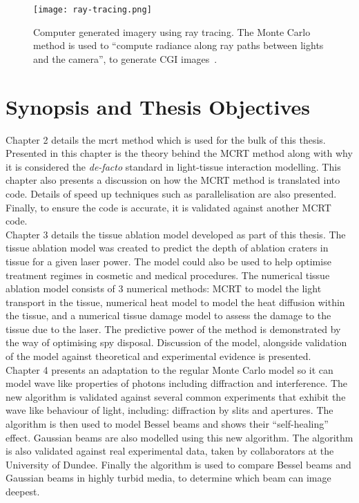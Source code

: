 \begin{figure}[!htbp]
\centering
\texttt{[image: ray-tracing.png]}
\caption{Computer generated imagery using ray tracing. The Monte Carlo method is used to ``compute radiance along ray paths between lights and the camera'', to generate CGI images~\cite{pharr2016physically}.}
\label{fig:ray-trace}
\end{figure}


\section{Synopsis and Thesis Objectives}

Chapter 2 details the \gls*{mcrt} method which is used for the bulk of this thesis.
Presented in this chapter is the theory behind the MCRT method along with why it is considered the \textit{de-facto} standard in light-tissue interaction modelling.
This chapter also presents a discussion on how the MCRT method is translated into code.
Details of speed up techniques such as parallelisation are also presented.
Finally, to ensure the code is accurate, it is validated against another MCRT code.\\


Chapter 3 details the tissue ablation model developed as part of this thesis.
The tissue ablation model was created to predict the depth of ablation craters in tissue for a given laser power.
The model could also be used to help optimise treatment regimes in cosmetic and medical procedures.
The numerical tissue ablation model consists of 3 numerical methods: MCRT to model the light transport in the tissue, numerical heat model to model the heat diffusion within the tissue, and a numerical tissue damage model to assess the damage to the tissue due to the laser.
The predictive power of the method is demonstrated by the way of optimising spy disposal.
Discussion of the model, alongside validation of the model against theoretical and experimental evidence is presented.\\


Chapter 4 presents an adaptation to the regular Monte Carlo model so it can model wave like properties of photons including diffraction and interference.
The new algorithm is validated against several common experiments that exhibit the wave like behaviour of light, including: diffraction by slits and apertures.
The algorithm is then used to model Bessel beams and shows their ``self-healing'' effect.
Gaussian beams are also modelled using this new algorithm.
The algorithm is also validated against real experimental data, taken by collaborators at the University of Dundee.
Finally the algorithm is used to compare Bessel beams and Gaussian beams in highly turbid media, to determine which beam can image deepest.\\


